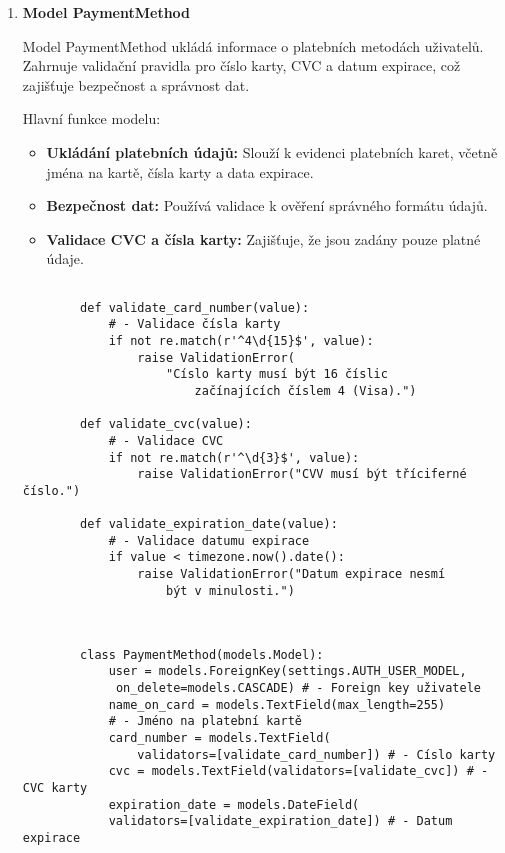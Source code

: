 \documentclass[12pt, a4paper,
twoside,        %
openright
]{report}
\begin{document}
\begin{enumerate}
	\item \textbf{Model PaymentMethod}
	
	Model PaymentMethod ukládá informace o platebních metodách uživatelů. Zahrnuje validační pravidla pro číslo karty, CVC a datum expirace, což zajišťuje bezpečnost a správnost dat.
	
	Hlavní funkce modelu:
	
	\begin{itemize}
		\item \textbf{Ukládání platebních údajů:} Slouží k evidenci platebních karet, včetně jména na kartě, čísla karty a data expirace.
		\item \textbf{Bezpečnost dat:} Používá validace k ověření správného formátu údajů.
		\item \textbf{Validace CVC a čísla karty:} Zajišťuje, že jsou zadány pouze platné údaje.
	\end{itemize}
	
	\clearpage
	\begin{lstlisting}[style=Python, caption={Validace platebních údajů}]
		
		def validate_card_number(value): 
			# - Validace čísla karty
			if not re.match(r'^4\d{15}$', value):
				raise ValidationError(
					"Císlo karty musí být 16 číslic 
						začínajících číslem 4 (Visa).")
		
		def validate_cvc(value):
			# - Validace CVC
			if not re.match(r'^\d{3}$', value):
				raise ValidationError("CVV musí být tříciferné číslo.")
		
		def validate_expiration_date(value):
			# - Validace datumu expirace
			if value < timezone.now().date():
				raise ValidationError("Datum expirace nesmí 
					být v minulosti.")
		
	\end{lstlisting}
	
	\begin{lstlisting}[style=Python, caption={Model PaymentMethod}]
		
		class PaymentMethod(models.Model):
			user = models.ForeignKey(settings.AUTH_USER_MODEL,
			 on_delete=models.CASCADE) # - Foreign key uživatele 
			name_on_card = models.TextField(max_length=255)
			# - Jméno na platební kartě 
			card_number = models.TextField(
				validators=[validate_card_number]) # - Císlo karty
			cvc = models.TextField(validators=[validate_cvc]) # - CVC karty
			expiration_date = models.DateField(
			validators=[validate_expiration_date]) # - Datum expirace
	\end{lstlisting}
\end{enumerate}
\end{document}
